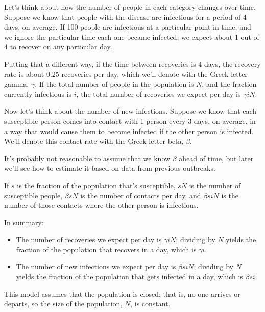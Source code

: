 \documentclass[12pt]{book}
\theoremstyle{exercise}
\begin{document}
Let's think about how the number of people in each category changes over time.  Suppose we know that people with the disease are infectious for a period of 4 days, on average.  If 100 people are infectious at a particular point in time, and we ignore the particular time each one became infected, we expect about 1 out of 4 to recover on any particular day.

Putting that a different way, if the time between recoveries is 4 days, the recovery rate is about 0.25 recoveries per day, which we'll denote with the Greek letter gamma, $\gamma$.  If the total number of people in the population is $N$, and the fraction currently infectious is $i$, the total number of recoveries we expect per day is $\gamma i N$.


Now let's think about the number of new infections.  Suppose we know that each susceptible person comes into contact with 1 person every 3 days, on average, in a way that would cause them to become infected if the other person is infected.  We'll denote this contact rate with the Greek letter beta, $\beta$.


It's probably not reasonable to assume that we know $\beta$ ahead of time, but later we'll see how to estimate it based on data from previous outbreaks.

If $s$ is the fraction of the population that's susceptible, $s N$ is the number of susceptible people, $\beta s N$ is the number of contacts per day, and $\beta s i N$ is the number of those contacts where the other person is infectious.


In summary:

\begin{itemize}

\item The number of recoveries we expect per day is $\gamma i N$; dividing by $N$ yields the fraction of the population that recovers in a day, which is $\gamma i$.

\item The number of new infections we expect per day is $\beta s i N$; dividing by $N$ yields the fraction of the population that gets infected in a day, which is $\beta s i$.

\end{itemize}

This model assumes that the population is closed; that is, no one arrives or departs, so the size of the population, $N$, is constant.
\end{document}
